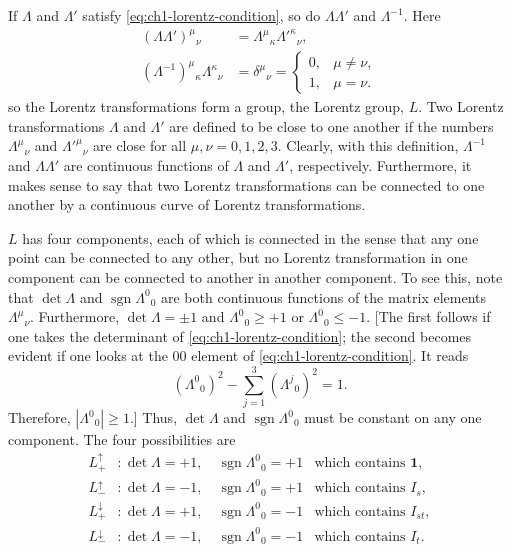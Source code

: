 If $\Lambda$ and $\Lambda'$ satisfy \eqref{eq:ch1-lorentz-condition}, so do
$\Lambda\Lambda'$ and $\Lambda^{-1}$. Here
\begin{equation}
\begin{aligned}
  (\Lambda\Lambda')^\mu{}_\nu
    &=\Lambda^\mu{}_\kappa\Lambda'^\kappa{}_\nu,\\
  (\Lambda^{-1})^\mu{}_\kappa\Lambda^\kappa{}_\nu
    &=\delta^\mu{}_\nu
    =\begin{cases}
      0,&\mu\ne\nu,\\
      1,&\mu=\nu .
    \end{cases}
\end{aligned}
\tag{1-6}\label{eq:ch1-lorentz-group-law}
\end{equation}
so the Lorentz transformations form a group, the Lorentz group, $L$. Two
Lorentz transformations $\Lambda$ and $\Lambda'$ are defined to be close to
one another if the numbers $\Lambda^\mu{}_\nu$ and
$\Lambda'^\mu{}_\nu$ are close for all $\mu,\nu=0,1,2,3$. Clearly, with
this definition, $\Lambda^{-1}$ and $\Lambda\Lambda'$ are continuous
functions of $\Lambda$ and $\Lambda'$, respectively. Furthermore, it makes
sense to say that two Lorentz transformations can be connected to one another
by a continuous curve of Lorentz transformations.

$L$ has four components, each of which is connected in the sense that any one
point can be connected to any other, but no Lorentz transformation in one
component can be connected to another in another component. To see this, note
that $\det\Lambda$ and $\operatorname{sgn}\Lambda^0{}_0$ are both
continuous functions of the matrix elements $\Lambda^\mu{}_\nu$.
Furthermore, $\det\Lambda=\pm1$ and $\Lambda^0{}_0\geq+1$ or
$\Lambda^0{}_0\leq-1$. [The first follows if one takes the
determinant of \eqref{eq:ch1-lorentz-condition}; the second becomes evident if one looks at the $00$
element of \eqref{eq:ch1-lorentz-condition}. It reads
\[
  (\Lambda^0{}_0)^2-\sum_{j=1}^3(\Lambda^j{}_0)^2=1.
\]
Therefore, $|\Lambda^0{}_0|\geq1$.] Thus, $\det\Lambda$ and
$\operatorname{sgn}\Lambda^0{}_0$ must be constant on any one component. The four
possibilities are
\begin{equation}
\begin{array}{rll}
  L^\uparrow_+ &: \det\Lambda=+1,\quad \operatorname{sgn}\Lambda^0{}_0=+1
    &\text{which contains }\mathbf{1},\\
  L^\uparrow_- &: \det\Lambda=-1,\quad \operatorname{sgn}\Lambda^0{}_0=+1
    &\text{which contains }I_s,\\
  L^\downarrow_+ &: \det\Lambda=+1,\quad \operatorname{sgn}\Lambda^0{}_0=-1
    &\text{which contains }I_{st},\\
  L^\downarrow_- &: \det\Lambda=-1,\quad \operatorname{sgn}\Lambda^0{}_0=-1
    &\text{which contains }I_t .
\end{array}
\tag{1-7}\label{eq:ch1-lorentz-components}
\end{equation}

